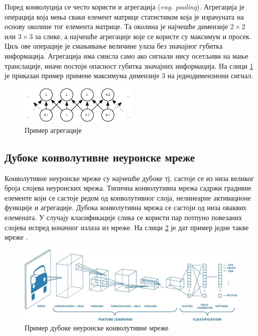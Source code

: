 \documentclass[11pt,oneside]{memoir}
\begin{document}
Поред конволуција се често користи и агрегација (\textit{eng. pooling}). Агрегација је операција која мења сваки елемент матрице
статистиком која је израчуната на основу околине тог елемента матрице. Та околина је најчешће димензије $2\times 2$ или $3\times 3$ за слике,
а најчешће агрегације које се користе су максимум и просек. Циљ ове операције је смањивање величине улаза без значајног губитка 
информација. Агрегација има смисла само ако сигнали нису осетљиви на мање транслације, иначе постоји опасност губитка значајних информација. 
На слици \ref{maxpool} је приказан пример примене максимума димензије $3$ на једнодимензиони сигнал.

\begin{figure}[H]
  \centering
  \includegraphics[width=0.5\textwidth]{images/maxpool.png}
  \caption{Пример агрегације\label{maxpool}}
\end{figure}

\subsection{Дубоке конволутивне неуронске мреже}

Конволутивне неуронске мреже су најчешће дубоке тј. састоје се из низа великог броја слојева неуронских мрежа. Типична конволутивна
мрежа садржи градивне елементе који се састоје редом од конволутивног слоја, нелинеарне активационе функције и агрегације. Дубока конволутивна
мрежа се састоји од низа оваквих елемената. У случају класификације слика се користи пар потпуно повезаних слојева испред коначног излаза из мреже.
На слици \ref{dcnn} је дат пример једне такве мреже \cite{deep_learning_goodfellow, ml_mladen}.

\begin{figure}[H]
  \centering
  \includegraphics[width=1.0\textwidth]{images/dcnn.jpeg}
  \caption{Пример дубоке неуронске конволутивне мреже \label{dcnn}}
\end{figure}
\end{document}
